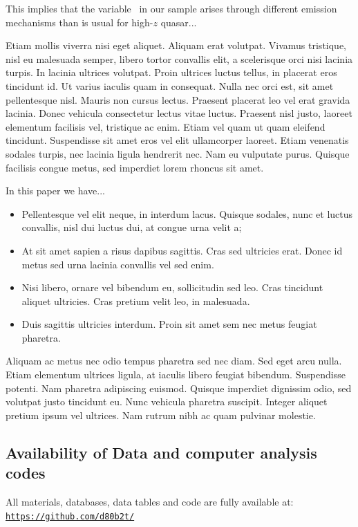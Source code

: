 \documentclass[a4paper,fleqn,usenatbib]{mnras}
\begin{document}
This implies that the variable \civ\ in our sample arises through
different emission mechanisms than is usual for high-$z$ quasar...

Etiam mollis viverra nisi eget aliquet. Aliquam erat volutpat. Vivamus
tristique, nisl eu malesuada semper, libero tortor convallis elit, a
scelerisque orci nisi lacinia turpis. In lacinia ultrices
volutpat. Proin ultrices luctus tellus, in placerat eros tincidunt
id. Ut varius iaculis quam in consequat. Nulla nec orci est, sit amet
pellentesque nisl. Mauris non cursus lectus. Praesent placerat leo vel
erat gravida lacinia. Donec vehicula consectetur lectus vitae
luctus. Praesent nisl justo, laoreet elementum facilisis vel,
tristique ac enim. Etiam vel quam ut quam eleifend
tincidunt. Suspendisse sit amet eros vel elit ullamcorper
laoreet. Etiam venenatis sodales turpis, nec lacinia ligula hendrerit
nec. Nam eu vulputate purus. Quisque facilisis congue metus, sed
imperdiet lorem rhoncus sit amet.

In this paper we have... 
\begin{itemize}
\item Pellentesque vel elit neque, in interdum lacus. Quisque sodales, nunc et luctus convallis, nisl dui luctus dui, at congue urna velit a; 
\item At sit amet sapien a risus dapibus sagittis. Cras sed ultricies erat. Donec id metus sed urna lacinia convallis vel sed enim. 
\item Nisi libero, ornare vel bibendum eu, sollicitudin sed leo. Cras tincidunt aliquet ultricies. Cras pretium velit leo, in malesuada. 
\item Duis sagittis ultricies interdum. Proin sit amet sem nec metus feugiat pharetra.
\end{itemize}

Aliquam ac metus nec odio tempus pharetra sed nec diam. Sed eget arcu
nulla. Etiam elementum ultrices ligula, at iaculis libero feugiat
bibendum. Suspendisse potenti. Nam pharetra adipiscing
euismod. Quisque imperdiet dignissim odio, sed volutpat justo
tincidunt eu. Nunc vehicula pharetra suscipit. Integer aliquet pretium
ipsum vel ultrices. Nam rutrum nibh ac quam pulvinar molestie.



\subsection*{Availability of Data and computer analysis codes} 
All materials, databases, data tables and code are fully available at: 
\href{https://github.com/d80b2t/VHzQ}{\tt https://github.com/d80b2t/}
\end{document}
